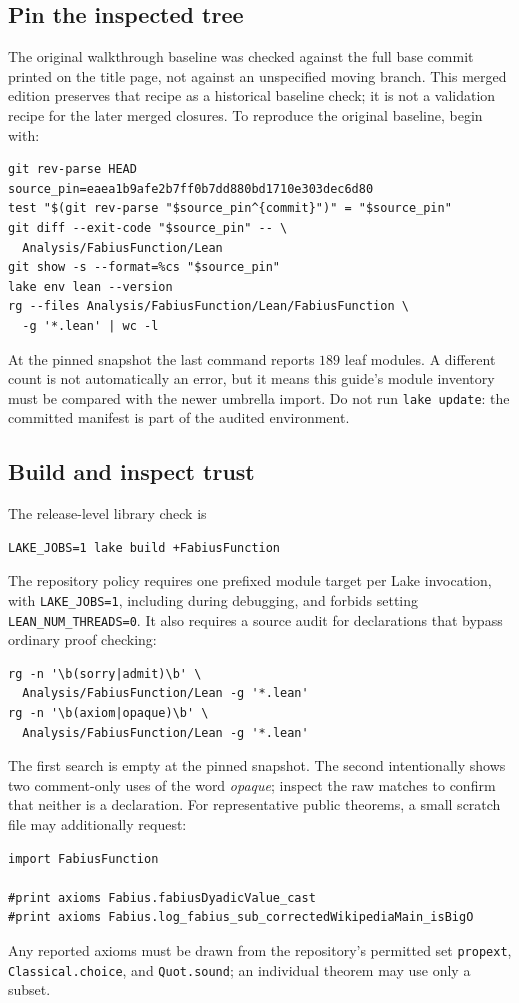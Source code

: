 \documentclass[11pt,oneside]{article}
\theoremstyle{definition}
\theoremstyle{remark}
\begin{document}
\subsection{Pin the inspected tree}
The original walkthrough baseline was checked against the full base commit
printed on the title page, not against an unspecified moving branch.  This
merged edition preserves that recipe as a historical baseline check; it is not
a validation recipe for the later merged closures.  To reproduce the original
baseline, begin with:
\begin{lstlisting}[style=pseudo,language={}]
git rev-parse HEAD
source_pin=eaea1b9afe2b7ff0b7dd880bd1710e303dec6d80
test "$(git rev-parse "$source_pin^{commit}")" = "$source_pin"
git diff --exit-code "$source_pin" -- \
  Analysis/FabiusFunction/Lean
git show -s --format=%cs "$source_pin"
lake env lean --version
rg --files Analysis/FabiusFunction/Lean/FabiusFunction \
  -g '*.lean' | wc -l
\end{lstlisting}
At the pinned snapshot the last command reports \(189\) leaf modules.  A
different count is not automatically an error, but it means this guide's
module inventory must be compared with the newer umbrella import.  Do not run
\texttt{lake update}: the committed manifest is part of the audited
environment.

\subsection{Build and inspect trust}
The release-level library check is
\begin{lstlisting}[style=pseudo,language={}]
LAKE_JOBS=1 lake build +FabiusFunction
\end{lstlisting}
The repository policy requires one prefixed module target per Lake invocation,
with \texttt{LAKE\_JOBS=1}, including during debugging, and forbids setting
\texttt{LEAN\_NUM\_THREADS=0}.  It also requires a source audit for declarations that bypass
ordinary proof checking:
\begin{lstlisting}[style=pseudo,language={}]
rg -n '\b(sorry|admit)\b' \
  Analysis/FabiusFunction/Lean -g '*.lean'
rg -n '\b(axiom|opaque)\b' \
  Analysis/FabiusFunction/Lean -g '*.lean'
\end{lstlisting}
The first search is empty at the pinned snapshot.  The second intentionally
shows two comment-only uses of the word \emph{opaque}; inspect the raw matches
to confirm that neither is a declaration.  For representative public theorems, a small
scratch file may additionally request:
\par\noindent
\begin{minipage}{\textwidth}
\begin{lstlisting}[style=pseudo]
import FabiusFunction

#print axioms Fabius.fabiusDyadicValue_cast
#print axioms Fabius.log_fabius_sub_correctedWikipediaMain_isBigO
\end{lstlisting}
\end{minipage}
\par
Any reported axioms must be drawn from the repository's permitted set
\nolinkurl{propext}, \nolinkurl{Classical.choice}, and \nolinkurl{Quot.sound}; an individual
theorem may use only a subset.
\end{document}
